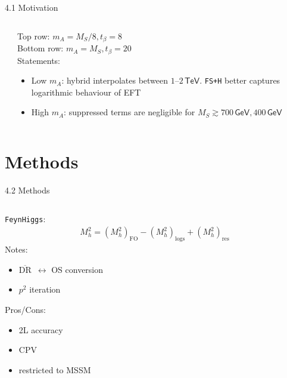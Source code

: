 \documentclass[hyperref={pdfpagelabels=false},ngerman]{beamer}
\newcommand{\cmark}{\ding{51}}%
\newcommand{\xmark}{\ding{55}}%
\newcommand{\eh}[1]{\,\mathsf{#1}}
\newcommand{\GeV}{\eh{GeV}}
\newcommand{\TeV}{\eh{TeV}}
\newcommand{\ok}{\textcolor{darkgreen}{\cmark}}
\newcommand{\notok}{\textcolor{red}{\xmark}}
\newcommand{\MS}{\ensuremath{M_S}}
\newcommand{\DRbar}{\ensuremath{\overline{\text{DR}}}}
\newcommand{\FH}{\texttt{FeynHiggs}\xspace}
\begin{document}
\begin{frame}{4.1 Motivation}
\begin{columns}
\begin{column}{0.6\textwidth}
\begin{center}
      \end{center}
    \end{column}
    \begin{column}{0.4\textwidth}
      Top row: $m_A = \MS/8, t_\beta = 8$\\[1em]
      Bottom row: $m_A = \MS, t_\beta = 20$\\[1em]
      Statements:
      \begin{itemize}
      \item Low $m_A$: hybrid interpolates between $1$--$2\TeV$.
        \texttt{FS+H} better captures logarithmic behaviour of EFT
      \item High $m_A$: suppressed terms are negligible for
        $\MS \gtrsim 700\GeV, 400\GeV$
      \end{itemize}
    \end{column}
  \end{columns}
\end{frame}

\section{Methods}

\begin{frame}{4.2 Methods}
    \begin{columns}
    \begin{column}{0.5\textwidth}
      \centering
      \texttt{[image: \{\{plots/kuts-9/4.2]}}}
    \end{column}
    \begin{column}{0.5\textwidth}
      \FH:
      \begin{align*}
        M_h^2 = (M_h^2)_{\text{FO}} - (M_h^2)_{\text{logs}} + (M_h^2)_{\text{res}}
      \end{align*}
      Notes:
      \begin{itemize}
      \item \DRbar\ $\leftrightarrow$ OS conversion
      \item $p^2$ iteration
      \end{itemize}
      Pros/Cons:
      \begin{itemize}
      \item[\ok] 2L accuracy
      \item[\ok] CPV
      \item[\notok] restricted to MSSM
      \end{itemize}
    \end{column}
  \end{columns}
\end{frame}
\end{document}
